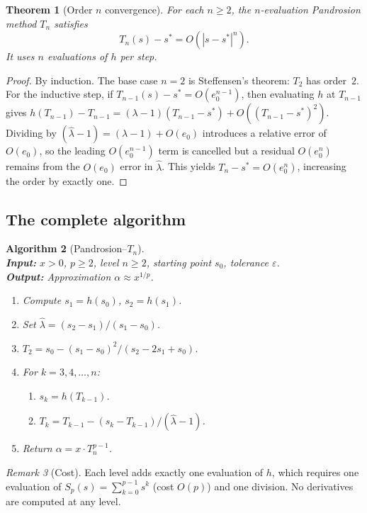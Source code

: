 \documentclass[10pt,a4paper,oneside]{book}
\newtheorem{theorem}{Theorem}[chapter]
\newtheorem{algorithm_def}[theorem]{Algorithm}
\theoremstyle{definition}
\theoremstyle{remark}
\newtheorem{remark}[theorem]{Remark}
\newcommand{\eps}{\varepsilon}
\begin{document}
\begin{theorem}[Order $n$ convergence]
\label{thm:general}
For each $n \geq 2$, the $n$-evaluation Pandrosion method $T_n$ satisfies
\[
  T_n(s) - s^* = O(|s - s^*|^{n}).
\]
It uses $n$ evaluations of $h$ per step.
\end{theorem}

\begin{proof}
By induction.  The base case $n=2$ is Steffensen's theorem: $T_2$ has order~$2$.  For the inductive step, if $T_{n-1}(s) - s^* = O(e_0^{n-1})$, then evaluating $h$ at $T_{n-1}$ gives $h(T_{n-1}) - T_{n-1} = (\lambda - 1)(T_{n-1} - s^*) + O((T_{n-1}-s^*)^2)$.  Dividing by $(\hat{\lambda} - 1) = (\lambda - 1) + O(e_0)$ introduces a relative error of $O(e_0)$, so the leading $O(e_0^{n-1})$ term is cancelled but a residual $O(e_0^{n})$ remains from the $O(e_0)$ error in $\hat{\lambda}$.  This yields $T_n - s^* = O(e_0^{n})$, increasing the order by exactly one.
\end{proof}

\subsection{The complete algorithm}

\begin{algorithm_def}[Pandrosion--$T_n$]
\label{alg:full}
\mbox{}\\
\textbf{Input:} $x > 0$, $p \geq 2$, level $n \geq 2$, starting point $s_0$, tolerance $\eps$. \\
\textbf{Output:} Approximation $\alpha \approx x^{1/p}$.
\begin{enumerate}
  \item Compute $s_1 = h(s_0)$, $s_2 = h(s_1)$.
  \item Set $\hat\lambda = (s_2 - s_1)/(s_1 - s_0)$.
  \item $T_2 = s_0 - (s_1 - s_0)^2/(s_2 - 2s_1 + s_0)$.
  \item For $k = 3, 4, \ldots, n$:
  \begin{enumerate}
    \item $s_k = h(T_{k-1})$.
    \item $T_k = T_{k-1} - (s_k - T_{k-1})/(\hat\lambda - 1)$.
  \end{enumerate}
  \item Return $\alpha = x \cdot T_n^{p-1}$.
\end{enumerate}
\end{algorithm_def}

\begin{remark}[Cost]
Each level adds exactly one evaluation of $h$, which requires one evaluation of $S_p(s) = \sum_{k=0}^{p-1} s^k$ (cost $O(p)$) and one division.  No derivatives are computed at any level.
\end{remark}
\end{document}

